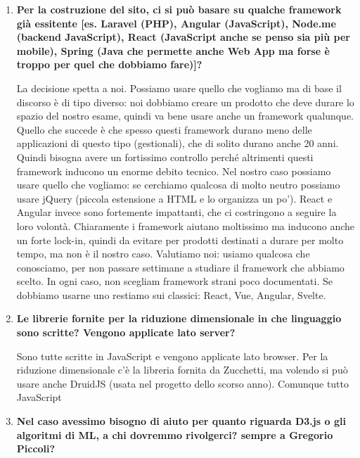\documentclass[11pt]{article}
\begin{document}
\begin{enumerate}
			\bigskip
			
			\item \textbf{Per la costruzione del sito, ci si può basare su qualche framework già essitente [es. Laravel (PHP), Angular (JavaScript), Node.me (backend JavaScript), React (JavaScript anche se penso sia più per mobile), Spring (Java che permette anche Web App ma forse è troppo per quel che dobbiamo fare)]?}
			
			\medskip
			
			La decisione spetta a noi. Possiamo usare quello che vogliamo ma di base il discorso è di tipo diverso: noi dobbiamo creare un prodotto che deve durare lo spazio del nostro esame, quindi va bene usare anche un framework qualunque. Quello che succede è che spesso questi framework durano meno delle applicazioni di questo tipo (gestionali), che di solito durano anche 20 anni. Quindi bisogna avere un fortissimo controllo perché altrimenti questi framework inducono un enorme debito tecnico. Nel nostro caso possiamo usare quello che vogliamo: se cerchiamo qualcosa di molto neutro possiamo usare jQuery (piccola estensione a HTML e lo organizza un po'). React e Angular invece sono fortemente impattanti, che ci costringono a seguire la loro volontà. Chiaramente i framework aiutano moltissimo ma inducono anche un forte lock-in, quindi da evitare per prodotti destinati a durare per molto tempo, ma non è il nostro caso. Valutiamo noi: usiamo qualcosa che conosciamo, per non passare settimane a studiare il framework che abbiamo scelto. In ogni caso, non scegliam framework strani poco documentati. Se dobbiamo usarne uno restiamo sui classici: React, Vue, Angular, Svelte.
			
			\bigskip
			
			\item \textbf{Le librerie fornite per la riduzione dimensionale in che linguaggio sono scritte? Vengono applicate lato server?}
			
			\medskip
			
			Sono tutte scritte in JavaScript e vengono applicate lato browser. Per la riduzione dimensionale c'è la libreria fornita da Zucchetti, ma volendo si può usare anche DruidJS (usata nel progetto dello scorso anno). Comunque tutto JavaScript
			
			\bigskip
			
			\item \textbf{Nel caso avessimo bisogno di aiuto per quanto riguarda D3.js o gli algoritmi di ML, a chi dovremmo rivolgerci? sempre a Gregorio Piccoli?}
			

\end{enumerate}
\end{document}
